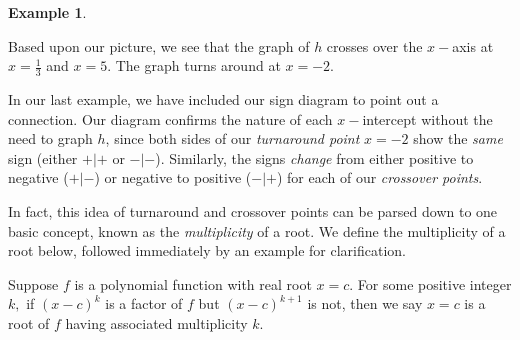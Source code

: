 \documentclass[12pt]{book}
\theoremstyle{definition}
\newtheorem{example}{Example}
\begin{document}
\begin{example}
\begin{center}
\end{center}
Based upon our picture, we see that the graph of $h$ crosses over the $x-$axis at $x=\frac{1}{3}$ and $x=5$.  The graph turns around at $x=-2$.  \end{example}
In our last example, we have included our sign diagram to point out a connection.  Our diagram confirms the nature of each $x-$intercept without the need to graph $h$, since both sides of our {\it turnaround point} $x=-2$ show the {\it same} sign (either $+|+$ or $-|-$).  Similarly, the signs {\it change} from either positive to negative ($+|-$) or negative to positive ($-|+$) for each of our {\it crossover points}.
\par
In fact, this idea of turnaround and crossover points can be parsed down to one basic concept, known as the {\it multiplicity} of a root.  We define the multiplicity of a root below, followed immediately by an example for clarification.
\par
Suppose $f$ is a polynomial function with real root $x=c$.  For some positive integer $k,$ if $(x-c)^{k}$ is a factor of $f$ but $(x-c)^{k+1}$ is not, then we say $x=c$ is a root of $f$ having associated multiplicity $k$.
\end{document}
